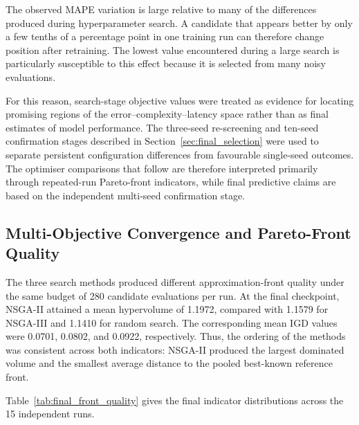 \documentclass[a4paper,fleqn]{cas-sc}
\begin{document}
The observed MAPE variation is large relative to many of the differences produced during hyperparameter search. A candidate that appears better by only a few tenths of a percentage point in one training run can therefore change position after retraining. The lowest value encountered during a large search is particularly susceptible to this effect because it is selected from many noisy evaluations.

For this reason, search-stage objective values were treated as evidence for locating promising regions of the error--complexity--latency space rather than as final estimates of model performance. The three-seed re-screening and ten-seed confirmation stages described in Section~\ref{sec:final_selection} were used to separate persistent configuration differences from favourable single-seed outcomes. The optimiser comparisons that follow are therefore interpreted primarily through repeated-run Pareto-front indicators, while final predictive claims are based on the independent multi-seed confirmation stage.


\subsection{Multi-Objective Convergence and Pareto-Front Quality}
\label{sec:optimizer_results}

The three search methods produced different approximation-front quality under the same budget of 280 candidate evaluations per run. At the final checkpoint, NSGA-II attained a mean hypervolume of 1.1972, compared with 1.1579 for NSGA-III and 1.1410 for random search. The corresponding mean IGD values were 0.0701, 0.0802, and 0.0922, respectively. Thus, the ordering of the methods was consistent across both indicators: NSGA-II produced the largest dominated volume and the smallest average distance to the pooled best-known reference front.

Table~\ref{tab:final_front_quality} gives the final indicator distributions across the 15 independent runs.
\end{document}
